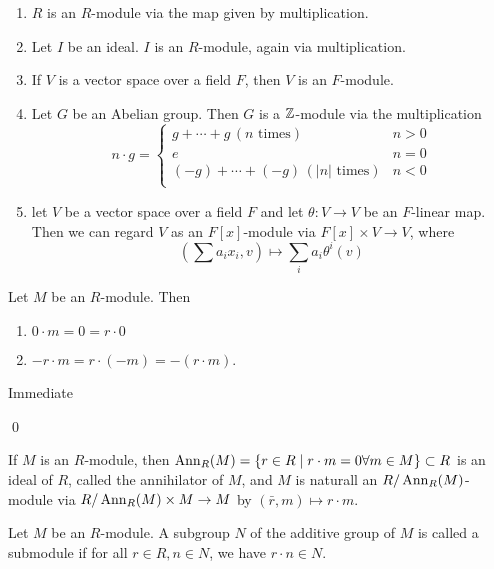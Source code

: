\documentclass[x11names,reqno,14pt]{extarticle}
\begin{document}
\begin{enumerate}

\item $R$ is an $R$-module via the map given by multiplication. 

\item Let $I$ be an ideal. $I$ is an $R$-module, again via multiplication. 

\item If $V$ is a vector space over a field $F$, then $V$ is an $F$-module. 

\item Let $G$ be an Abelian group. Then $G$ is a $\mathbb{Z}$-module via the multiplication 
\[
n\cdot g = \begin{cases} g + \cdots + g \,(\text{$n$ times}) & n > 0 \\ e & n = 0 \\ (-g) + \cdots + (-g) \,(\text{$|n|$ times}) & n < 0 \\ \end{cases}
\]

\item let $V$ be a vector space over a field $F$ and let $\theta:V\to V$ be an $F$-linear map. Then we can regard $V$ as an $F[x]$-module via $F[x]\times V\to V$, where
\[
(\sum a_ix_i, v) \mapsto \sum_i a_i\theta^i(v)
\]

\end{enumerate}

\prop 

Let $M$ be an $R$-module. Then
\begin{enumerate}

\item $0\cdot m = 0 = r\cdot 0$

\item $-r\cdot m = r\cdot(-m) = -(r\cdot m)$. 

\end{enumerate}

\proof

Immediate

\qed

\rem If $M$ is an $R$-module, then $\operatorname{\mathrm{Ann}}_R(M) = \{r\in R\mid r \cdot m = 0 \forall m \in M\}\subset R$ is an ideal of $R$, called the annihilator of $M$, and $M$ is naturall an $R/\operatorname{\mathrm{Ann}}_R(M)$-module via $R/\operatorname{\mathrm{Ann}}_R(M)\times M\to M$ by $(\bar{r},m)\mapsto r\cdot m$. 


Let $M$ be an $R$-module. A subgroup $N$ of the additive group of $M$ is called a submodule if for all $r \in R, n \in N$, we have $r\cdot n \in N$.
\end{document}
